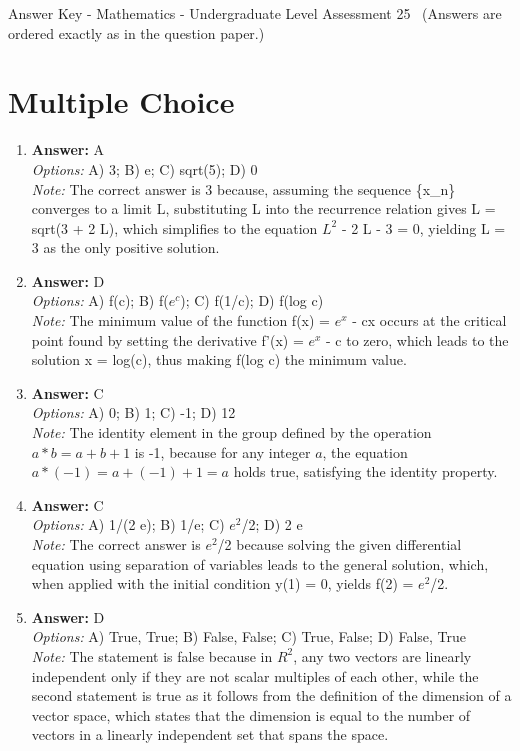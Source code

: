 \documentclass[12pt]{article}
\begin{document}
\begin{center}
Answer Key - Mathematics - Undergraduate Level Assessment 25 \
\small (Answers are ordered exactly as in the question paper.)
\end{center}

\section*{Multiple Choice}
\begin{enumerate}[label=\arabic*.]
\item \textbf{Answer:} A
\\ \textit{Options:} A) 3; B) e; C) sqrt(5); D) 0
\\ \textit{Note:} The correct answer is 3 because, assuming the sequence \{x\_n\} converges to a limit L, substituting L into the recurrence relation gives L = sqrt(3 + 2 L), which simplifies to the equation $L^2$ - 2 L - 3 = 0, yielding L = 3 as the only positive solution.
\item \textbf{Answer:} D
\\ \textit{Options:} A) f(c); B) f($e^c$); C) f(1/c); D) f(log c)
\\ \textit{Note:} The minimum value of the function f(x) = $e^x$ - cx occurs at the critical point found by setting the derivative f'(x) = $e^x$ - c to zero, which leads to the solution x = log(c), thus making f(log c) the minimum value.
\item \textbf{Answer:} C
\\ \textit{Options:} A) 0; B) 1; C) -1; D) 12
\\ \textit{Note:} The identity element in the group defined by the operation \( a * b = a + b + 1 \) is -1, because for any integer \( a \), the equation \( a * (-1) = a + (-1) + 1 = a \) holds true, satisfying the identity property.
\item \textbf{Answer:} C
\\ \textit{Options:} A) 1/(2 e); B) 1/e; C) $e^2$/2; D) 2 e
\\ \textit{Note:} The correct answer is $e^2$/2 because solving the given differential equation using separation of variables leads to the general solution, which, when applied with the initial condition y(1) = 0, yields f(2) = $e^2$/2.
\item \textbf{Answer:} D
\\ \textit{Options:} A) True, True; B) False, False; C) True, False; D) False, True
\\ \textit{Note:} The statement is false because in $R^2$, any two vectors are linearly independent only if they are not scalar multiples of each other, while the second statement is true as it follows from the definition of the dimension of a vector space, which states that the dimension is equal to the number of vectors in a linearly independent set that spans the space.
\end{enumerate}
\end{document}
